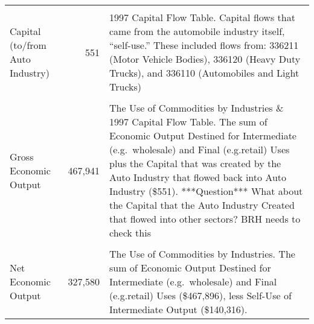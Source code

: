\begin{table}
\begin{center}
\begin{tabular}{l r @{\hspace{2em}} p{7cm}}
&&\\
    Capital (to/from Auto Industry) &  551 & 1997 Capital Flow Table. Capital  flows that came from the automobile industry itself, ``self-use.''  These included flows from:  336211 (Motor Vehicle Bodies), 336120 (Heavy Duty Trucks), and 336110 (Automobiles and Light Trucks)      \\
&&\\
    Gross Economic Output & 467,941  &  The Use of Commodities by Industries \& 1997 Capital Flow Table. The sum of Economic Output Destined for Intermediate (e.g.\ wholesale) and Final (e.g.retail) Uses plus the Capital that was created by the Auto Industry that flowed back into Auto Industry (\$551). ***Question*** What about the Capital that the Auto Industry Created that flowed into other sectors? BRH needs to check this  \\ 
&&\\
    Net Economic Output & 327,580   &  The Use of Commodities by Industries. The sum of Economic Output Destined for Intermediate (e.g.\ wholesale) and Final (e.g.retail) Uses (\$467,896), less Self-Use of Intermediate Output (\$140,316).  \\
    \bottomrule
  \end{tabular}

\end{center}
\label{tab:calculations}
\end{table}







%
%

